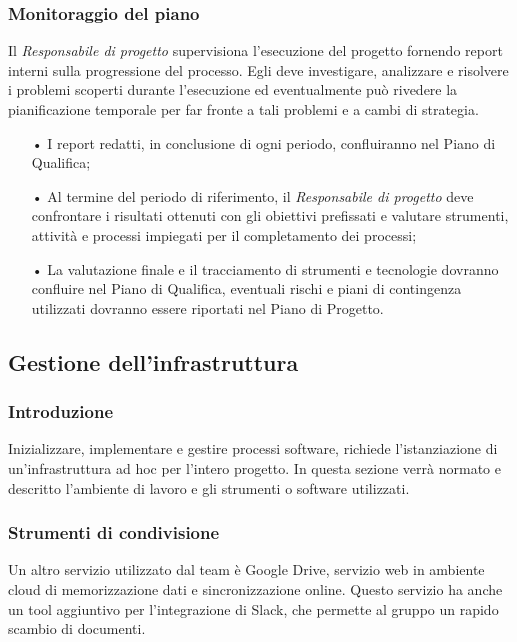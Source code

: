 \subsubsection{Monitoraggio del piano}
Il \textit{Responsabile di progetto} supervisiona l'esecuzione del progetto fornendo report interni sulla progressione del processo. 
\newline
Egli deve investigare, analizzare e risolvere i problemi scoperti durante l'esecuzione ed eventualmente può rivedere la pianificazione temporale per far fronte a tali problemi e a cambi di strategia.
\begin{itemize}
\item[•] I report redatti, in conclusione di ogni periodo, confluiranno nel Piano di Qualifica;
\item[•] Al termine del periodo di riferimento, il \textit{Responsabile di progetto} deve confrontare i risultati ottenuti 
        con gli obiettivi prefissati e valutare strumenti, attività e processi impiegati per il completamento dei processi;
\item[•] La valutazione finale e il tracciamento di strumenti e tecnologie dovranno confluire nel Piano di Qualifica,
         eventuali rischi e piani di contingenza utilizzati dovranno essere riportati nel Piano di Progetto.
\end{itemize}

\subsection{Gestione dell'infrastruttura}
    \subsubsection{Introduzione}\mbox{}
    Inizializzare, implementare e gestire processi software, richiede l’istanziazione di un'infrastruttura ad hoc per l'intero 
    progetto. In questa sezione verrà normato e descritto l'ambiente di lavoro e gli strumenti o software utilizzati.

\subsubsection{Strumenti di condivisione}\mbox{}
    Un altro servizio utilizzato dal team è Google Drive, servizio web in {ambiente cloud} di memorizzazione dati 
    e sincronizzazione online. Questo servizio ha anche un tool aggiuntivo per l'integrazione di Slack, che permette al 
    gruppo un rapido scambio di documenti.

